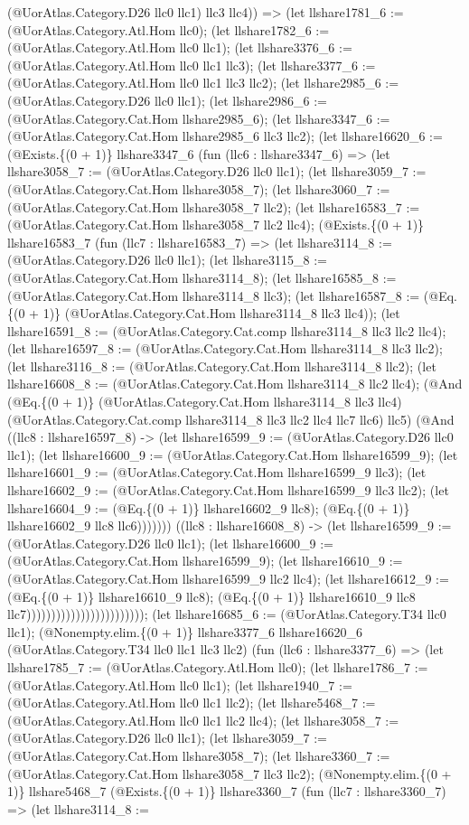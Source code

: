 \documentclass[11pt]{article}
\begin{document}
(@UorAtlas.Category.D26 llc0 llc1) llc3 llc4)) => (let llshare1781\_6 := (@UorAtlas.Category.Atl.Hom llc0); (let llshare1782\_6 := (@UorAtlas.Category.Atl.Hom llc0 llc1); (let llshare3376\_6 := (@UorAtlas.Category.Atl.Hom llc0 llc1 llc3); (let llshare3377\_6 := (@UorAtlas.Category.Atl.Hom llc0 llc1 llc3 llc2); (let llshare2985\_6 := (@UorAtlas.Category.D26 llc0 llc1); (let llshare2986\_6 := (@UorAtlas.Category.Cat.Hom llshare2985\_6); (let llshare3347\_6 := (@UorAtlas.Category.Cat.Hom llshare2985\_6 llc3 llc2); (let llshare16620\_6 := (@Exists.\{(0 + 1)\} llshare3347\_6 (fun (llc6 : llshare3347\_6) => (let llshare3058\_7 := (@UorAtlas.Category.D26 llc0 llc1); (let llshare3059\_7 := (@UorAtlas.Category.Cat.Hom llshare3058\_7); (let llshare3060\_7 := (@UorAtlas.Category.Cat.Hom llshare3058\_7 llc2); (let llshare16583\_7 := (@UorAtlas.Category.Cat.Hom llshare3058\_7 llc2 llc4); (@Exists.\{(0 + 1)\} llshare16583\_7 (fun (llc7 : llshare16583\_7) => (let llshare3114\_8 := (@UorAtlas.Category.D26 llc0 llc1); (let llshare3115\_8 := (@UorAtlas.Category.Cat.Hom llshare3114\_8); (let llshare16585\_8 := (@UorAtlas.Category.Cat.Hom llshare3114\_8 llc3); (let llshare16587\_8 := (@Eq.\{(0 + 1)\} (@UorAtlas.Category.Cat.Hom llshare3114\_8 llc3 llc4)); (let llshare16591\_8 := (@UorAtlas.Category.Cat.comp llshare3114\_8 llc3 llc2 llc4); (let llshare16597\_8 := (@UorAtlas.Category.Cat.Hom llshare3114\_8 llc3 llc2); (let llshare3116\_8 := (@UorAtlas.Category.Cat.Hom llshare3114\_8 llc2); (let llshare16608\_8 := (@UorAtlas.Category.Cat.Hom llshare3114\_8 llc2 llc4); (@And (@Eq.\{(0 + 1)\} (@UorAtlas.Category.Cat.Hom llshare3114\_8 llc3 llc4) (@UorAtlas.Category.Cat.comp llshare3114\_8 llc3 llc2 llc4 llc7 llc6) llc5) (@And ((llc8 : llshare16597\_8) -> (let llshare16599\_9 := (@UorAtlas.Category.D26 llc0 llc1); (let llshare16600\_9 := (@UorAtlas.Category.Cat.Hom llshare16599\_9); (let llshare16601\_9 := (@UorAtlas.Category.Cat.Hom llshare16599\_9 llc3); (let llshare16602\_9 := (@UorAtlas.Category.Cat.Hom llshare16599\_9 llc3 llc2); (let llshare16604\_9 := (@Eq.\{(0 + 1)\} llshare16602\_9 llc8); (@Eq.\{(0 + 1)\} llshare16602\_9 llc8 llc6))))))) ((llc8 : llshare16608\_8) -> (let llshare16599\_9 := (@UorAtlas.Category.D26 llc0 llc1); (let llshare16600\_9 := (@UorAtlas.Category.Cat.Hom llshare16599\_9); (let llshare16610\_9 := (@UorAtlas.Category.Cat.Hom llshare16599\_9 llc2 llc4); (let llshare16612\_9 := (@Eq.\{(0 + 1)\} llshare16610\_9 llc8); (@Eq.\{(0 + 1)\} llshare16610\_9 llc8 llc7)))))))))))))))))))))))); (let llshare16685\_6 := (@UorAtlas.Category.T34 llc0 llc1); (@Nonempty.elim.\{(0 + 1)\} llshare3377\_6 llshare16620\_6 (@UorAtlas.Category.T34 llc0 llc1 llc3 llc2) (fun (llc6 : llshare3377\_6) => (let llshare1785\_7 := (@UorAtlas.Category.Atl.Hom llc0); (let llshare1786\_7 := (@UorAtlas.Category.Atl.Hom llc0 llc1); (let llshare1940\_7 := (@UorAtlas.Category.Atl.Hom llc0 llc1 llc2); (let llshare5468\_7 := (@UorAtlas.Category.Atl.Hom llc0 llc1 llc2 llc4); (let llshare3058\_7 := (@UorAtlas.Category.D26 llc0 llc1); (let llshare3059\_7 := (@UorAtlas.Category.Cat.Hom llshare3058\_7); (let llshare3360\_7 := (@UorAtlas.Category.Cat.Hom llshare3058\_7 llc3 llc2); (@Nonempty.elim.\{(0 + 1)\} llshare5468\_7 (@Exists.\{(0 + 1)\} llshare3360\_7 (fun (llc7 : llshare3360\_7) => (let llshare3114\_8 := 
\end{document}
